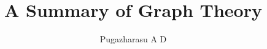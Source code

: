 \documentclass[a4paper,12pt]{book}
\begin{document}
\author{Pugazharasu A D}
\title{A Summary of Graph Theory}

\frontmatter
\maketitle
\tableofcontents

\mainmatter



\backmatter
\end{document}

